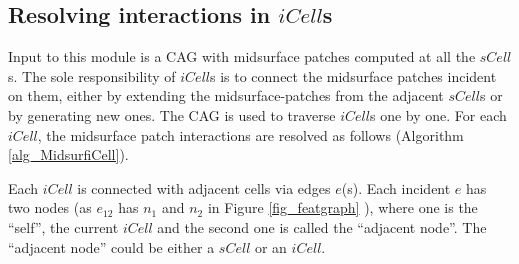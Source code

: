 %
%

\subsection{Resolving interactions in $iCell$s}
\label{sec:icell}
Input to this module is a CAG with midsurface patches computed at all the $sCell$s. The sole responsibility of $iCell$s is to connect the midsurface patches incident on them, either by extending the midsurface-patches from the adjacent $sCell$s or by generating new ones.  The CAG is used to traverse $iCell$s one by one. For each $iCell$, the midsurface patch interactions are resolved as follows (Algorithm \ref{alg_MidsurfiCell}). 

Each $iCell$ is connected with adjacent cells via edges $e$(s).  Each incident $e$ has two nodes (as $e_{12}$ has $n_1$ and $n_2$  in Figure \ref{fig_featgraph} ), where one is the ``self'', the current $iCell$ and the second one is called the ``adjacent node''.  The ``adjacent node'' could be either a $sCell$ or an $iCell$.  

